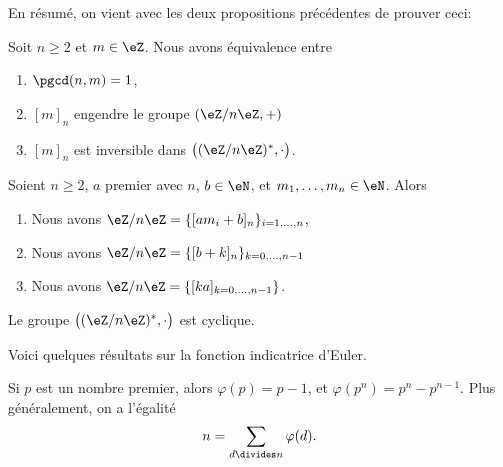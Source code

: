 En résumé, on vient avec les deux propositions précédentes de prouver ceci:

\begin{proposition}       \label{PROPooMTWGooEMbvDi}
    Soit \( n\geq 2\) et \( m\in \eZ\). Nous avons équivalence entre
    \begin{enumerate}
        \item
            \( \pgcd(n,m)=1\),
        \item
            \( [m]_n\) engendre le groupe \( (\eZ/n\eZ,+)\)
        \item
            \( [m]_n\) est inversible dans \( \big( (\eZ/n\eZ)^*,\cdot \big)\).
    \end{enumerate}
\end{proposition}

\begin{proposition}       \label{PROPooSKSYooZoDhIP}
    Soient \( n\geq 2\), $a$ premier avec \( n\), \( b\in \eN\), et \( m_1,\ldots, m_n\in \eN\). Alors
    \begin{enumerate}
        \item
            Nous avons $\eZ/n\eZ=\{ [am_i+b]_n \}_{i=1,\ldots, n}$,
        \item
            Nous avons \( \eZ/n\eZ=\{ [b+k]_n \}_{k=0,\ldots, n-1}\)
        \item
            Nous avons \( \eZ/n\eZ=\{ [ka]_{k=0,\ldots, n-1} \}\).
    \end{enumerate}
\end{proposition}

\begin{proposition}       \label{PROPooKSCRooPyInSv}
    Le groupe \( \big( (\eZ/n\eZ)^*, \cdot\big)\) est cyclique.
\end{proposition}


Voici quelques résultats sur la fonction indicatrice d'Euler.
\begin{proposition}
Si \( p\) est un nombre premier, alors \( \varphi(p)=p-1\), et \( \varphi(p^n)=p^n-p^{n-1}\). Plus généralement, on a l'égalité
\begin{equation}        \label{EqTPHqgJ}
       n=\sum_{d\divides n}\varphi(d).
\end{equation}
\end{proposition}

